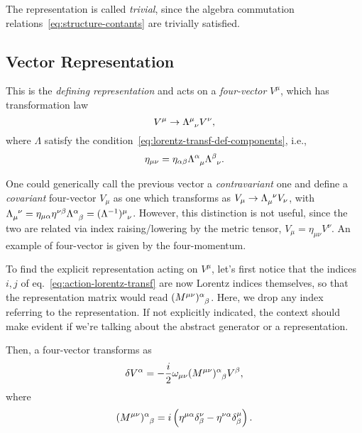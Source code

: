 The representation is called \emph{trivial}, since the algebra commutation relations~\eqref{eq:structure-contants} are trivially satisfied.

\subsection{Vector Representation}
This is the \emph{defining representation} and acts on a \emph{four-vector} $V^\mu$, which has transformation law
\begin{equation}\label{eq:lorentz-transf-four-vector}
    V^\mu \to \tensor{\Lambda}{^\mu_\nu} V^\nu,
\end{equation}
where $\Lambda$ satisfy the condition~\eqref{eq:lorentz-transf-def-components}, i.e.,
\begin{equation*}
    \eta_{\mu\nu} = \eta_{\alpha\beta} \tensor{\Lambda}{^\alpha_\mu} \tensor{\Lambda}{^\beta_\nu}.
\end{equation*}

One could generically call the previous vector a \emph{contravariant} one and define a \emph{covariant} four-vector $V_\mu$ as one which transforms as $V_\mu \to \tensor{\Lambda}{_\mu^\nu} V_\nu$, with $\tensor{\Lambda}{_\mu^\nu} = \eta_{\mu\alpha} \eta^{\nu\beta} \tensor{\Lambda}{^\alpha_\beta} = \tensor{(\Lambda^{-1})}{^\mu_\nu}$. However, this distinction is not useful, since the two are related via index raising/lowering by the metric tensor, $V_\mu = \eta_{\mu\nu} V^\nu$. An example of four-vector is given by the four-momentum.

To find the explicit representation acting on $V^\mu$, let's first notice that the indices $i,j$ of eq.~\eqref{eq:action-lorentz-transf} are now Lorentz indices themselves, so that the representation matrix would read $\tensor{(M^{\mu\nu})}{^\alpha_\beta}$. Here, we drop any index referring to the representation. If not explicitly indicated, the context should make evident if we're talking about the abstract generator or a representation. 

Then, a four-vector transforms as
\begin{equation}\label{eq:variation-lorentz-transf-four-vector}
   \delta V^\alpha = - \frac{i}{2} \omega_{\mu\nu} \tensor{(M^{\mu\nu})}{^\alpha_\beta} V^\beta ,
\end{equation}
where
\begin{equation}\label{eq:lorentz-transf-matrix-vector-rep}
    \tensor{(M^{\mu\nu})}{^\alpha_\beta} = i \left( \eta^{\mu\alpha} \delta^\nu_\beta - \eta^{\nu\alpha} \delta^\mu_\beta \right) .
\end{equation}

